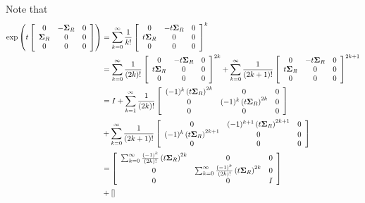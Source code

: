 \documentclass[11pt]{article}
\begin{document}
\begin{enumerate}
Note that
\begin{align*}
\exp\left(t \left[\begin{array}{ccc}
0 & -\boldsymbol{\Sigma}_{R} & 0 \\ 
\boldsymbol{\Sigma}_{R}& 0 & 0 \\ 
0 & 0 & 0
\end{array} \right]\right)
&= \sum_{k=0}^{\infty}\frac{1}{k!}\left[\begin{array}{ccc}
0 & -t\boldsymbol{\Sigma}_{R} & 0 \\ 
t\boldsymbol{\Sigma}_{R}& 0 & 0 \\ 
0 & 0 & 0
\end{array} \right]^{k}\\
&= \sum_{k=0}^{\infty}\frac{1}{(2k)!}\left[\begin{array}{ccc}
0 & -t\boldsymbol{\Sigma}_{R} & 0 \\ 
t\boldsymbol{\Sigma}_{R}& 0 & 0 \\ 
0 & 0 & 0
\end{array} \right]^{2k}
+
\sum_{k=0}^{\infty}\frac{1}{(2k+1)!}\left[\begin{array}{ccc}
0 & -t\boldsymbol{\Sigma}_{R} & 0 \\ 
t\boldsymbol{\Sigma}_{R}& 0 & 0 \\ 
0 & 0 & 0
\end{array} \right]^{2k+1}\\
&=I+
\sum_{k=1}^{\infty}\frac{1}{(2k)!}\left[\begin{array}{ccc}
(-1)^{k}\left(t\boldsymbol{\Sigma}_{R}\right)^{2k} & 0 & 0 \\ 
0& (-1)^{k}\left(t\boldsymbol{\Sigma}_{R}\right)^{2k}  & 0 \\ 
0 & 0 & 0
\end{array} \right]
\\
&+
\sum_{k=0}^{\infty}\frac{1}{(2k+1)!}\left[\begin{array}{ccc}
0 & (-1)^{k+1}\left(t\boldsymbol{\Sigma}_{R}\right)^{2k+1} & 0 \\ 
(-1)^{k}\left(t\boldsymbol{\Sigma}_{R}\right)^{2k+1}& 0 & 0 \\ 
0 & 0 & 0
\end{array}\right]\\
&= \left[\begin{array}{ccc}
\sum_{k=0}^{\infty}\frac{(-1)^{k}}{(2k)!}\left(t\boldsymbol{\Sigma}_{R}\right)^{2k} & 0 & 0 \\ 
0& \sum_{k=0}^{\infty}\frac{(-1)^{k}}{(2k)!}\left(t\boldsymbol{\Sigma}_{R}\right)^{2k}  & 0 \\ 
0 & 0 & I
\end{array} \right]\\
& + \left[\begin{array}{ccc}

\end{array}\right]
\end{align*}
\end{enumerate}
\end{document}
